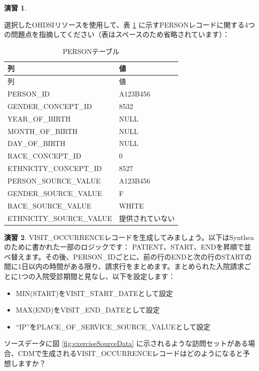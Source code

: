 \documentclass[
  11pt]{book}
\providecommand{\tightlist}{%
  \setlength{\itemsep}{0pt}\setlength{\parskip}{0pt}}
\theoremstyle{definition}
\theoremstyle{definition}
\theoremstyle{definition}
\newtheorem{exercise}{演習}[chapter]
\theoremstyle{definition}
\theoremstyle{remark}
\begin{document}
\begin{exercise}
\protect\hypertarget{exr:exerciseEtl2}{}\label{exr:exerciseEtl2}

選択したOHDSIリソースを使用して、表 \ref{tab:exercisePersonTable} に示すPERSONレコードに関する4つの問題点を指摘してください（表はスペースのため省略されています）：

\begin{longtable}[]{@{}ll@{}}
\caption{\label{tab:exercisePersonTable} PERSONテーブル}\tabularnewline
\toprule\noalign{}
列 & 値 \\
\midrule\noalign{}
\endfirsthead
\toprule\noalign{}
列 & 値 \\
\midrule\noalign{}
\endhead
\bottomrule\noalign{}
\endlastfoot
PERSON\_ID & A123B456 \\
GENDER\_CONCEPT\_ID & 8532 \\
YEAR\_OF\_BIRTH & NULL \\
MONTH\_OF\_BIRTH & NULL \\
DAY\_OF\_BIRTH & NULL \\
RACE\_CONCEPT\_ID & 0 \\
ETHNICITY\_CONCEPT\_ID & 8527 \\
PERSON\_SOURCE\_VALUE & A123B456 \\
GENDER\_SOURCE\_VALUE & F \\
RACE\_SOURCE\_VALUE & WHITE \\
ETHNICITY\_SOURCE\_VALUE & 提供されていない \\
\end{longtable}

\end{exercise}

\begin{exercise}
\protect\hypertarget{exr:exerciseEtl3}{}\label{exr:exerciseEtl3}VISIT\_OCCURRENCEレコードを生成してみましょう。以下はSyntheaのために書かれた一部のロジックです：
PATIENT、START、ENDを昇順で並べ替えます。その後、PERSON\_IDごとに、前の行のENDと次の行のSTARTの間に1日以内の時間がある限り、請求行をまとめます。まとめられた入院請求ごとに1つの入院受診期間と見なし、以下を設定します：

\begin{itemize}
\tightlist
\item
  MIN(START)をVISIT\_START\_DATEとして設定
\item
  MAX(END)をVISIT\_END\_DATEとして設定
\item
  ``IP''をPLACE\_OF\_SERVICE\_SOURCE\_VALUEとして設定
\end{itemize}

ソースデータに図 \ref{fig:exerciseSourceData} に示されるような訪問セットがある場合、CDMで生成されるVISIT\_OCCURRENCEレコードはどのようになると予想しますか？
\end{exercise}
\end{document}

